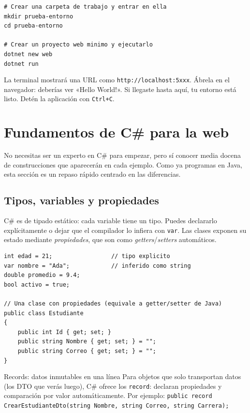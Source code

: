 \documentclass[11pt]{article}
\begin{document}
\begin{cajacodigo}
\begin{lstlisting}[style=shell]
# Crear una carpeta de trabajo y entrar en ella
mkdir prueba-entorno
cd prueba-entorno

# Crear un proyecto web minimo y ejecutarlo
dotnet new web
dotnet run
\end{lstlisting}
\end{cajacodigo}
\vspace{2pt}
La terminal mostrará una URL como \texttt{http://localhost:5xxx}. Ábrela en el navegador: deberías ver «Hello World!». Si llegaste hasta aquí, tu entorno está listo. Detén la aplicación con \texttt{Ctrl+C}.
\section{Fundamentos de C\# para la web}
No necesitas ser un experto en C\# para empezar, pero sí conocer media docena de construcciones que aparecerán en cada ejemplo. Como ya programas en Java, esta sección es un repaso rápido centrado en las diferencias.

\subsection{Tipos, variables y propiedades}
C\# es de tipado estático: cada variable tiene un tipo. Puedes declararlo explícitamente o dejar que el compilador lo infiera con \texttt{var}. Las clases exponen su estado mediante \emph{propiedades}, que son como \emph{getters}/\emph{setters} automáticos.

\begin{cajacodigo}
\begin{lstlisting}[style=cs]
int edad = 21;                 // tipo explicito
var nombre = "Ada";            // inferido como string
double promedio = 9.4;
bool activo = true;

// Una clase con propiedades (equivale a getter/setter de Java)
public class Estudiante
{
    public int Id { get; set; }
    public string Nombre { get; set; } = "";
    public string Correo { get; set; } = "";
}
\end{lstlisting}
\end{cajacodigo}
\vspace{2pt}
\begin{cajatip}{Records: datos inmutables en una línea}
Para objetos que solo transportan datos (los DTO que verás luego), C\# ofrece los \texttt{record}: declaran propiedades y comparación por valor automáticamente. Por ejemplo: \texttt{public record CrearEstudianteDto(string Nombre, string Correo, string Carrera);}\par
\end{cajatip}
\end{document}
